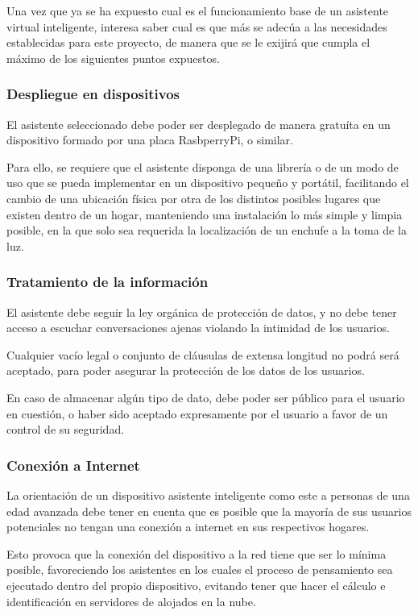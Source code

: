 Una vez que ya se ha expuesto cual es el funcionamiento base de un asistente virtual inteligente, interesa saber cual es que más se adecúa a las necesidades establecidas para este proyecto, de manera que se le exijirá que cumpla el máximo de los siguientes puntos expuestos.

\subsubsection{Despliegue en dispositivos}

El asistente seleccionado debe poder ser desplegado de manera gratuíta en un dispositivo formado por una placa RasbperryPi, o similar.

Para ello, se requiere que el asistente disponga de una librería o de un modo de uso que se pueda implementar en un dispositivo pequeño y portátil, facilitando el cambio de una ubicación física por otra de los distintos posibles lugares que existen dentro de un hogar, manteniendo una instalación lo más simple y limpia posible, en la que solo sea requerida la localización de un enchufe a la toma de la luz.

\subsubsection{Tratamiento de la información}

El asistente debe seguir la ley orgánica de protección de datos, y no debe tener acceso a escuchar conversaciones ajenas violando la intimidad de los usuarios.

Cualquier vacío legal o conjunto de cláusulas de extensa longitud no podrá será aceptado, para poder asegurar la protección de los datos de los usuarios.

En caso de almacenar algún tipo de dato, debe poder ser público para el usuario en cuestión, o haber sido aceptado expresamente por el usuario a favor de un control de su seguridad.

\subsubsection{Conexión a Internet}

La orientación de un dispositivo asistente inteligente como este a personas de una edad avanzada debe tener en cuenta que es posible que la mayoría de sus usuarios potenciales no tengan una conexión a internet en sus respectivos hogares.

Esto provoca que la conexión del dispositivo a la red tiene que ser lo mínima posible, favoreciendo los asistentes en los cuales el proceso de pensamiento sea ejecutado dentro del propio dispositivo, evitando tener que hacer el cálculo e identificación en servidores de alojados en la nube.

